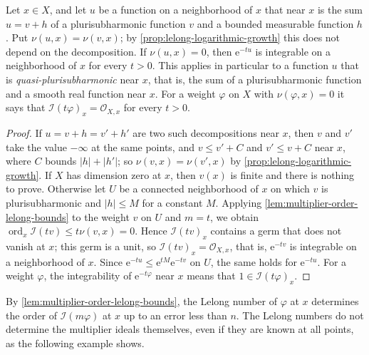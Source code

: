 \begin{corollary}\label{cor:zero-lelong-trivial-multiplier-ideal}
Let $x\in X$, and let $u$ be a function on a neighborhood of $x$ that near $x$ is the sum $u=v+h$ of a plurisubharmonic function $v$ and a bounded measurable function $h$. Put $\nu(u,x)=\nu(v,x)$; by \cref{prop:lelong-logarithmic-growth} this does not depend on the decomposition. If $\nu(u,x)=0$, then $\mathrm e^{-tu}$ is integrable on a neighborhood of $x$ for every $t>0$. This applies in particular to a function $u$ that is \emph{quasi-plurisubharmonic} near $x$, that is, the sum of a plurisubharmonic function and a smooth real function near $x$. For a weight $\varphi$ on $X$ with $\nu(\varphi,x)=0$ it says that $\mathcal I(t\varphi)_x=\mathcal O_{X,x}$ for every $t>0$.
\end{corollary}
\begin{proof}
If $u=v+h=v'+h'$ are two such decompositions near $x$, then $v$ and $v'$ take the value $-\infty$ at the same points, and $v\leq v'+C$ and $v'\leq v+C$ near $x$, where $C$ bounds $|h|+|h'|$; so $\nu(v,x)=\nu(v',x)$ by \cref{prop:lelong-logarithmic-growth}. If $X$ has dimension zero at $x$, then $v(x)$ is finite and there is nothing to prove. Otherwise let $U$ be a connected neighborhood of $x$ on which $v$ is plurisubharmonic and $|h|\leq M$ for a constant $M$. Applying \cref{lem:multiplier-order-lelong-bounds} to the weight $v$ on $U$ and $m=t$, we obtain $\operatorname{ord}_x\mathcal I(tv)\leq t\nu(v,x)=0$. Hence $\mathcal I(tv)_x$ contains a germ that does not vanish at $x$; this germ is a unit, so $\mathcal I(tv)_x=\mathcal O_{X,x}$, that is, $\mathrm e^{-tv}$ is integrable on a neighborhood of $x$. Since $\mathrm e^{-tu}\leq\mathrm e^{tM}\mathrm e^{-tv}$ on $U$, the same holds for $\mathrm e^{-tu}$. For a weight $\varphi$, the integrability of $\mathrm e^{-t\varphi}$ near $x$ means that $1\in\mathcal I(t\varphi)_x$.
\end{proof}

By \cref{lem:multiplier-order-lelong-bounds}, the Lelong number of $\varphi$ at $x$ determines the order of $\mathcal I(m\varphi)$ at $x$ up to an error less than $n$. The Lelong numbers do not determine the multiplier ideals themselves, even if they are known at all points, as the following example shows.

